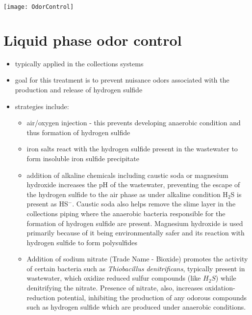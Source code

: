\begin{center}
\texttt{[image: OdorControl]}
\end{center}
\section{Liquid phase odor control}
\begin{itemize}
	\item typically applied in the collections systems
	\item goal for this treatment is to prevent nuisance odors associated with the production and release of hydrogen sulfide
	\item strategies include:
		\begin{itemize}
			\item air/oxygen injection - this prevents developing anaerobic condition and thus  formation of hydrogen sulfide
			\item iron salts react with the hydrogen sulfide present in the wastewater to form insoluble iron sulfide precipitate
			\item addition of alkaline chemicals including caustic soda or magnesium hydroxide increases the pH of the wastewater, preventing the escape of the hydrogen sulfide to the air phase as under alkaline condition H$_2$S is present as HS$^-$.  Caustic soda also helps remove the slime layer in the collections piping where the anaerobic bacteria responsible for the formation of hydrogen sulfide are present.  Magnesium hydroxide is used primarily because of it being environmentally safer and its reaction with hydrogen sulfide to form polysulfides
			\item Addition of sodium nitrate (Trade Name - Bioxide) promotes the activity of certain bacteria such as \textit{Thiobacillus denitrificans}, typically present in wastewater, which oxidize reduced sulfur compounds (like $H_2S$) while denitrifying the nitrate.  Presence of nitrate, also, increases oxidation-reduction potential, inhibiting the production of any odorous compounds such as hydrogen sulfide which are produced under anaerobic conditions.
		\end{itemize} 
\end{itemize}

